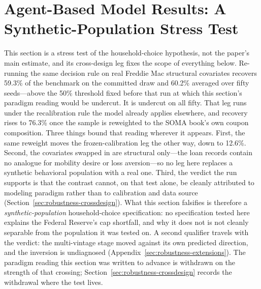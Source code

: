 \section{Agent-Based Model Results: A Synthetic-Population Stress Test}\label{sec:abm}

This section is a stress test of the household-choice hypothesis, not the paper's main estimate, and its cross-design leg fixes the scope of everything below. Re-running the same decision rule on real Freddie Mac structural covariates recovers 59.3\% of the benchmark on the committed draw and 60.2\% averaged over fifty seeds---above the 50\% threshold fixed before that run at which this section's paradigm reading would be undercut. It is undercut on all fifty. That leg runs under the recalibration rule the model already applies elsewhere, and recovery rises to 76.3\% once the sample is reweighted to the SOMA book's own coupon composition. Three things bound that reading wherever it appears. First, the same reweight moves the frozen-calibration leg the other way, down to 12.6\%. Second, the covariates swapped in are structural only---the loan records contain no analogue for mobility desire or loss aversion---so no leg here replaces a synthetic behavioral population with a real one. Third, the verdict the run supports is that the contrast cannot, on that test alone, be cleanly attributed to modeling paradigm rather than to calibration and data source (Section~\ref{sec:robustness-crossdesign}). What this section falsifies is therefore a \emph{synthetic-population} household-choice specification: no specification tested here explains the Federal Reserve's cap shortfall, and why it does not is not cleanly separable from the population it was tested on. A second qualifier travels with the verdict: the multi-vintage stage moved against its own predicted direction, and the inversion is undiagnosed (Appendix~\ref{sec:robustness-extensions}). The paradigm reading this section was written to advance is withdrawn on the strength of that crossing; Section~\ref{sec:robustness-crossdesign} records the withdrawal where the test lives.

